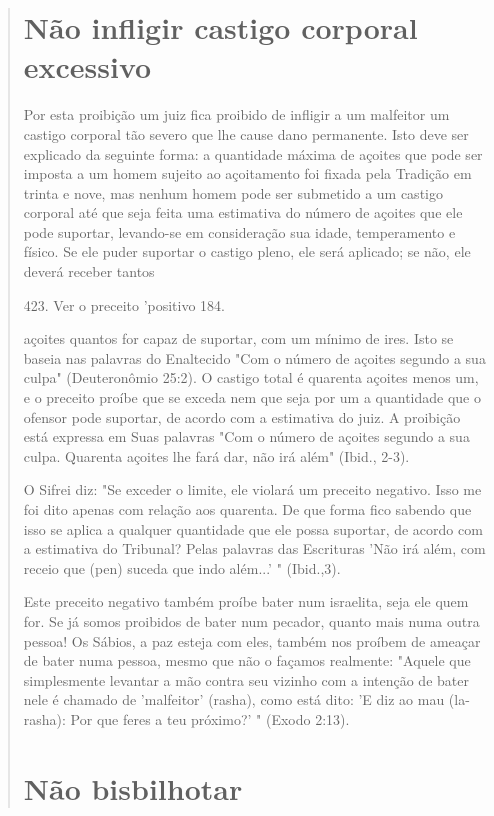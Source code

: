 \begin{quote}
\section{Não infligir castigo corporal excessivo}

Por esta proibição um juiz fica proibido de infligir a um malfeitor um
castigo corporal tão severo que lhe cause dano permanente. Isto deve ser
explicado da seguinte forma: a quantidade máxima de açoites que pode ser
im­posta a um homem sujeito ao açoitamento foi fixada pela Tradição em
trinta e nove, mas nenhum homem pode ser submetido a um castigo corporal
até que seja feita uma estimativa do número de açoites que ele pode
suportar, levando-se em consideração sua idade, temperamento e físico.
Se ele puder su­portar o castigo pleno, ele será aplicado; se não, ele
deverá receber tantos

423. Ver o preceito 'positivo 184.

açoites quantos for capaz de suportar, com um mínimo de ires. Isto se
baseia nas palavras do Enaltecido "Com o número de açoites segundo a sua
culpa" (Deuteronômio 25:2). O castigo total é quarenta açoites menos um,
e o precei­to proíbe que se exceda nem que seja por um a quantidade que
o ofensor pode suportar, de acordo com a estimativa do juiz. A proibição
está expressa em Suas palavras "Com o número de açoites segundo a sua
culpa. Quarenta açoites lhe fará dar, não irá além" (Ibid., 2-3).

O Sifrei diz: "Se exceder o limite, ele violará um preceito negativo.
Isso me foi dito apenas com relação aos quarenta. De que forma fico
sabendo que isso se aplica a qualquer quantidade que ele possa suportar,
de acordo com a estimativa do Tribunal? Pelas palavras das Escrituras
'Não irá além, com re­ceio que (pen) suceda que indo além...' "
(Ibid.,3).

Este preceito negativo também proíbe bater num israelita, seja ele quem
for. Se já somos proibidos de bater num pecador, quanto mais numa ou­tra
pessoa! Os Sábios, a paz esteja com eles, também nos proíbem de ameaçar
de bater numa pessoa, mesmo que não o façamos realmente: "Aquele que
sim­plesmente levantar a mão contra seu vizinho com a intenção de bater
nele é chamado de 'malfeitor' (rasha), como está dito: 'E diz ao mau
(la-rasha): Por que feres a teu próximo?' " (Exodo 2:13).

\section{Não bisbilhotar}


\end{quote}
